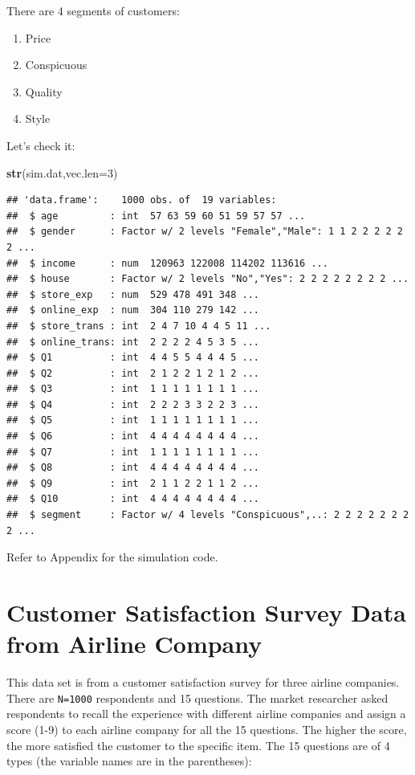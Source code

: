 \documentclass[12pt,]{krantz}
\makeatletter
\newenvironment{Shaded}{\begin{snugshade}}{\end{snugshade}}
\newcommand{\DataTypeTok}[1]{\textcolor[rgb]{0.27,0.27,0.27}{#1}}
\newcommand{\DecValTok}[1]{\textcolor[rgb]{0.06,0.06,0.06}{#1}}
\newcommand{\KeywordTok}[1]{\textcolor[rgb]{0.27,0.27,0.27}{\textbf{#1}}}
\newcommand{\NormalTok}[1]{#1}
\providecommand{\tightlist}{%
  \setlength{\itemsep}{0pt}\setlength{\parskip}{0pt}}
\newenvironment{kframe}{%
\medskip{}
\setlength{\fboxsep}{.8em}
 \def\at@end@of@kframe{}%
 \ifinner\ifhmode%
  \def\at@end@of@kframe{\end{minipage}}%
  \begin{minipage}{\columnwidth}%
 \fi\fi%
 \def\FrameCommand##1{\hskip\@totalleftmargin \hskip-\fboxsep
 \colorbox{shadecolor}{##1}\hskip-\fboxsep
     \hskip-\linewidth \hskip-\@totalleftmargin \hskip\columnwidth}%
 \MakeFramed {\advance\hsize-\width
   \@totalleftmargin\z@ \linewidth\hsize
   \@setminipage}}%
 {\par\unskip\endMakeFramed%
 \at@end@of@kframe}
\renewenvironment{Shaded}{\begin{kframe}}{\end{kframe}}
\makeatother
\begin{document}
There are 4 segments of customers:

\begin{enumerate}
\def\labelenumi{\arabic{enumi}.}
\tightlist
\item
  Price
\item
  Conspicuous
\item
  Quality
\item
  Style
\end{enumerate}

Let's check it:

\begin{Shaded}
\begin{Highlighting}[]
\KeywordTok{str}\NormalTok{(sim.dat,}\DataTypeTok{vec.len=}\DecValTok{3}\NormalTok{)}
\end{Highlighting}
\end{Shaded}

\begin{verbatim}
## 'data.frame':    1000 obs. of  19 variables:
##  $ age         : int  57 63 59 60 51 59 57 57 ...
##  $ gender      : Factor w/ 2 levels "Female","Male": 1 1 2 2 2 2 2 2 ...
##  $ income      : num  120963 122008 114202 113616 ...
##  $ house       : Factor w/ 2 levels "No","Yes": 2 2 2 2 2 2 2 2 ...
##  $ store_exp   : num  529 478 491 348 ...
##  $ online_exp  : num  304 110 279 142 ...
##  $ store_trans : int  2 4 7 10 4 4 5 11 ...
##  $ online_trans: int  2 2 2 2 4 5 3 5 ...
##  $ Q1          : int  4 4 5 5 4 4 4 5 ...
##  $ Q2          : int  2 1 2 2 1 2 1 2 ...
##  $ Q3          : int  1 1 1 1 1 1 1 1 ...
##  $ Q4          : int  2 2 2 3 3 2 2 3 ...
##  $ Q5          : int  1 1 1 1 1 1 1 1 ...
##  $ Q6          : int  4 4 4 4 4 4 4 4 ...
##  $ Q7          : int  1 1 1 1 1 1 1 1 ...
##  $ Q8          : int  4 4 4 4 4 4 4 4 ...
##  $ Q9          : int  2 1 1 2 2 1 1 2 ...
##  $ Q10         : int  4 4 4 4 4 4 4 4 ...
##  $ segment     : Factor w/ 4 levels "Conspicuous",..: 2 2 2 2 2 2 2 2 ...
\end{verbatim}

Refer to Appendix for the simulation code.

\hypertarget{customer-satisfaction-survey-data-from-airline-company}{%
\section{Customer Satisfaction Survey Data from Airline Company}\label{customer-satisfaction-survey-data-from-airline-company}}

This data set is from a customer satisfaction survey for three airline companies. There are \texttt{N=1000} respondents and 15 questions. The market researcher asked respondents to recall the experience with different airline companies and assign a score (1-9) to each airline company for all the 15 questions. The higher the score, the more satisfied the customer to the specific item. The 15 questions are of 4 types (the variable names are in the parentheses):
\end{document}
